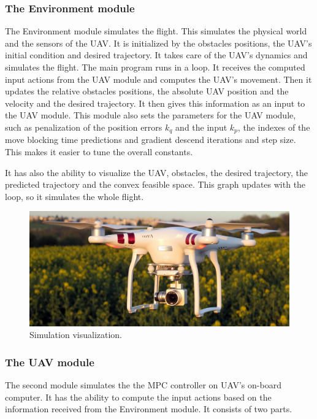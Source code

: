 \documentclass[a4paper,11pt,titlepage]{article}
\begin{document}
\subsubsection{The Environment module}

The Environment module simulates the flight. This simulates the physical world and the sensors of the UAV. It is initialized by the obstacles positions, the UAV's initial condition and desired trajectory. It takes care of the UAV's dynamics and simulates the flight. The main program runs in a loop. It receives the computed input actions from the UAV module and computes the UAV's movement. Then it updates the relative obstacles positions, the absolute UAV position and the velocity and the desired trajectory. It then gives this information as an input to the UAV module. 
This module also sets the parameters for the UAV module, such as penalization of the position errors $k_q$ and the input $k_p$, the indexes of the move blocking time predictions and gradient descend iterations and step size. This makes it easier to tune the overall constants.

It has also the ability to visualize the UAV, obstacles, the desired trajectory, the predicted trajectory and the convex feasible space. This graph updates with the loop, so it simulates the whole flight. 

\begin{figure}[h]
\centering
\includegraphics[width=1\linewidth]{fig/phantom.jpg}
\caption{Simulation visualization.}
\label{fig:phantom}
\end{figure}

\subsubsection{The UAV module}

The second module simulates the the MPC controller on UAV's on-board computer. It has the ability to compute the input actions based on the information received from the Environment module. It consists of two parts. 
\end{document}
